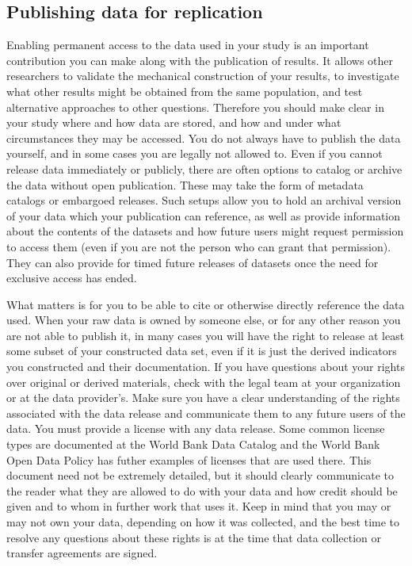 \subsection{Publishing data for replication}

Enabling permanent access to the data used in your study
is an important contribution you can make along with the publication of results.
It allows other researchers to validate the mechanical construction of your results,
to investigate what other results might be obtained from the same population,
and test alternative approaches to other questions.
Therefore you should make clear in your study
where and how data are stored, and how and under what circumstances they may be accessed.
You do not always have to publish the data yourself,
and in some cases you are legally not allowed to.
Even if you cannot release data immediately or publicly,
there are often options to catalog or archive the data without open publication.
These may take the form of metadata catalogs or embargoed releases.
Such setups allow you to hold an archival version of your data
which your publication can reference,
as well as provide information about the contents of the datasets
and how future users might request permission to access them
(even if you are not the person who can grant that permission).
They can also provide for timed future releases of datasets
once the need for exclusive access has ended.

What matters is for you to be able to cite or otherwise directly reference the data used.
When your raw data is owned by someone else,
or for any other reason you are not able to publish it,
in many cases you will have the right to release
at least some subset of your constructed data set,
even if it is just the derived indicators you constructed and their documentation.
If you have questions about your rights over original or derived materials,
check with the legal team at your organization or at the data provider's.
Make sure you have a clear understanding of the rights associated with the data release
and communicate them to any future users of the data.
You must provide a license with any data release.
Some common license types are documented at the World Bank Data Catalog
and the World Bank Open Data Policy has futher examples of licenses that are used there.
This document need not be extremely detailed,
but it should clearly communicate to the reader what they are allowed to do with your data and
how credit should be given and to whom in further work that uses it.
Keep in mind that you may or may not own your data,
depending on how it was collected,
and the best time to resolve any questions about these rights
is at the time that data collection or transfer agreements are signed.

